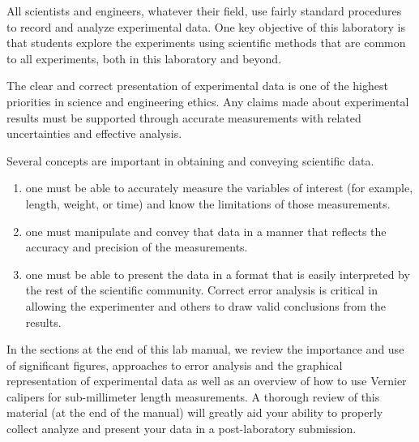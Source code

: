 



All scientists and engineers, whatever their field, use fairly standard procedures to record and analyze experimental data.
One key objective of this laboratory is that students explore the experiments using scientific methods that are common to all experiments, both in this laboratory and beyond.

The clear and correct presentation of experimental data is one of the highest priorities in science and engineering ethics.
Any claims made about experimental results must be supported through accurate measurements with related uncertainties and effective analysis.

Several concepts are important in obtaining and conveying scientific data.
\begin{enumerate}
  \item one must be able to accurately measure the variables of interest (for example, length, weight, or time) and know the limitations of those measurements.
  \item one must manipulate and convey that data in a manner that reflects the accuracy and precision of the measurements.
  \item one must be able to present the data in a format that is easily interpreted by the rest of the scientific community. Correct error analysis is critical in allowing the experimenter and others to draw valid conclusions from the results.
\end{enumerate}

In the sections at the end of this lab manual, we review the importance and use of significant figures, approaches to error analysis and the graphical representation of experimental data as well as an overview of how to use Vernier calipers for sub-millimeter length measurements.
A thorough review of this material (at the end of the manual) will greatly aid your ability to properly collect analyze and present your data in a post-laboratory submission.


